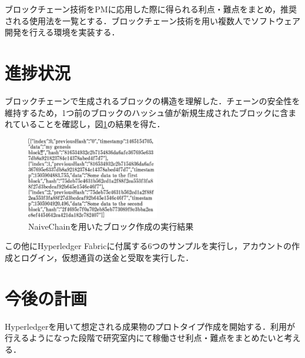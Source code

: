 \documentclass[uplatex,twocolumn,dvipdfmx]{jsarticle}
\begin{document}
ブロックチェーン技術をPMに応用した際に得られる利点・難点をまとめ，推奨される使用法を一覧とする．ブロックチェーン技術を用い複数人でソフトウェア開発を行える環境を実装する．

\section{進捗状況}

ブロックチェーンで生成されるブロックの構造を理解した．チェーンの安全性を維持するため，1つ前のブロックのハッシュ値が新規生成されたブロックに含まれていることを確認し，図\ref{naivechain}の結果を得た．

\begin{figure}[h]
\centering
\includegraphics[width=5.8cm,clip]{chaincode.pdf}
\caption{NaiveChainを用いたブロック作成の実行結果}\label{naivechain}
\end{figure}

この他にHyperledger Fabricに付属する6つのサンプルを実行し，アカウントの作成とログイン，仮想通貨の送金と受取を実行した． 

\section{今後の計画}

Hyperledgerを用いて想定される成果物のプロトタイプ作成を開始する．利用が行えるようになった段階で研究室内にて稼働させ利点・難点をまとめたいと考える．


\end{document}
